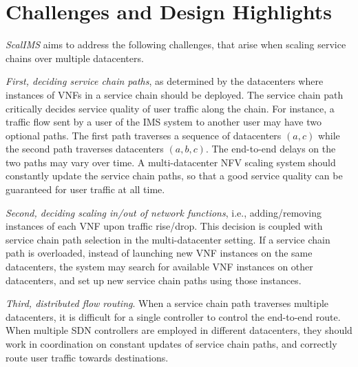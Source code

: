 \section{Challenges and Design Highlights}

\textit{ScalIMS} aims to address the following challenges, that arise when scaling service chains over multiple datacenters.

{\em First, deciding service chain paths}, as determined by the datacenters where instances of VNFs in a service chain should be deployed. The service chain path critically decides service quality of user traffic along the chain.
For instance, a traffic flow sent by a user of the IMS system to another user may have two optional paths. The first path traverses a sequence of datacenters $(a, c)$ while the second path traverses datacenters $(a, b, c)$. %
The end-to-end delays on the two paths may vary over time. A multi-datacenter NFV scaling system should constantly update the service chain paths, so that a good service quality can be guaranteed for user traffic at all time.


{\em Second, deciding scaling in/out of network functions}, i.e., adding/removing instances of each VNF upon traffic rise/drop. This decision is coupled with service chain path selection in the multi-datacenter setting. If a service chain path is  overloaded, instead of launching new VNF instances on the same datacenters, the system may search for available VNF instances on other datacenters, and set up new service chain paths using those instances. %

{\em Third, distributed flow routing}. %
When a service chain path traverses multiple datacenters, it is difficult for a single controller to control the end-to-end route. %
 When multiple SDN controllers are employed in different datacenters, they should work in coordination on constant updates of service chain paths, and correctly route user traffic towards destinations.

